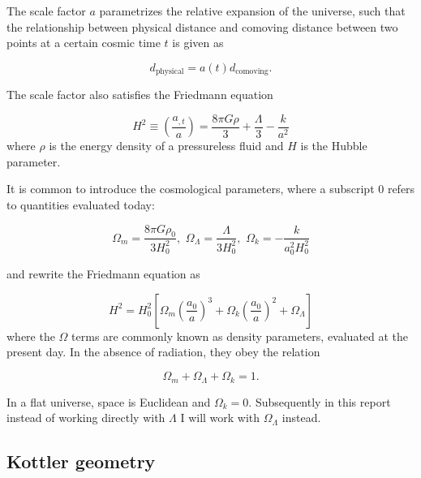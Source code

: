 The scale factor $a$ parametrizes the relative expansion of the universe, such that the relationship between physical distance and comoving distance between two points at a certain cosmic time $t$ is given as

\begin{equation}
  d_{\text{physical}} = a(t) d_{\text{comoving}}.
  \label{eq:comoving-physical-distance}
\end{equation}

The scale factor also satisfies the Friedmann equation

\begin{equation}
  H^2 \equiv \left ( \frac{a_{,t}}{a} \right ) = \frac{8\pi G \rho}{3} + \frac{\Lambda}{3} - \frac{k}{a^2}
  \label{eq:friedmann-equation}
\end{equation}
where $\rho$ is the energy density of a pressureless fluid and $H$ is the Hubble parameter. 

It is common to introduce the cosmological parameters, where a subscript 0 refers to quantities evaluated today: 

\begin{equation}
  \Omega_m = \frac{8\pi G \rho_0}{3H_0^2}, \,\, \Omega_{\Lambda} = \frac{\Lambda}{3H_0^2}, \,\, \Omega_k = - \frac{k}{a_0^2 H_0^2}
  \label{eq:cosmo-params}
\end{equation}

and rewrite the Friedmann equation as

\begin{equation}
  H^2 = H_0^2 \left [ \Omega_m \left ( \frac{a_0}{a}\right )^3 + \Omega_k \left ( \frac{a_0}{a}\right )^2 + \Omega_{\Lambda} \right ]
  \label{eq:friedmann-eqn-version2}
\end{equation}
where the $\Omega$ terms are commonly known as density parameters, evaluated at the present day. In the absence of radiation, they obey the relation

\begin{equation}
  \Omega_m + \Omega_{\Lambda} + \Omega_k = 1.
  \label{eq:density-parameters-1}   
\end{equation} 

In a flat universe, space is Euclidean and $\Omega_k = 0$. Subsequently in this report instead of working directly with $\Lambda$ I will work with $\Omega_{\Lambda}$ instead. 

\subsection{Kottler geometry}

